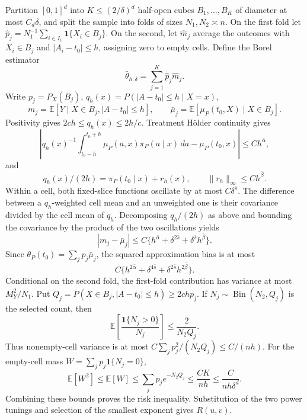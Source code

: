 Partition \([0,1]^d\) into \(K\le(2/\delta)^d\) half-open cubes \(B_1,\ldots,B_K\) of diameter at most \(C_d\delta\), and split the sample into folds of sizes \(N_1,N_2\asymp n\). On the first fold let \(\widehat p_j=N_1^{-1}\sum_{i\in I_1}\mathbf1\{X_i\in B_j\}\). On the second, let \(\widehat m_j\) average the outcomes with \(X_i\in B_j\) and \(\lvert A_i-t_0\rvert\le h\), assigning zero to empty cells. Define the Borel estimator
\[
\widehat\theta_{h,\delta}=\sum_{j=1}^K\widehat p_j\widehat m_j.
\]
Write \(p_j=P_X(B_j)\), \(q_h(x)=P(\lvert A-t_0\rvert\le h\mid X=x)\),
\[
m_j=\mathbb E[Y\mid X\in B_j,\lvert A-t_0\rvert\le h],
\qquad
\bar\mu_j=\mathbb E[\mu_P(t_0,X)\mid X\in B_j].
\]
Positivity gives \(2ch\le q_h(x)\le2h/c\). Treatment Hölder continuity gives
\[
\left|q_h(x)^{-1}\int_{t_0-h}^{t_0+h}
\mu_P(a,x)\pi_P(a\mid x)\,da-\mu_P(t_0,x)\right|
\le Ch^{\bar\alpha},
\]
and
\[
q_h(x)/(2h)=\pi_P(t_0\mid x)+r_h(x),
\qquad \|r_h\|_\infty\le Ch^{\bar\beta}.
\]
Within a cell, both fixed-slice functions oscillate by at most \(C\delta^{\bar s}\). The difference between a \(q_h\)-weighted cell mean and an unweighted one is their covariance divided by the cell mean of \(q_h\). Decomposing \(q_h/(2h)\) as above and bounding the covariance by the product of the two oscillations yields
\[
|m_j-\bar\mu_j|
\le C\{h^{\bar\alpha}+\delta^{2\bar s}+\delta^{\bar s}h^{\bar\beta}\}.
\]
Since \(\theta_P(t_0)=\sum_jp_j\bar\mu_j\), the squared approximation bias is at most
\[
C\{h^{2\bar\alpha}+\delta^{4\bar s}+\delta^{2\bar s}h^{2\bar\beta}\}.
\]
Conditional on the second fold, the first-fold contribution has variance at most \(M_Y^2/N_1\). Put \(Q_j=P(X\in B_j,|A-t_0|\le h)\ge2chp_j\). If \(N_j\sim\operatorname{Bin}(N_2,Q_j)\) is the selected count, then
\[
\mathbb E\!\left[\frac{\mathbf1\{N_j>0\}}{N_j}\right]
\le\frac{2}{N_2Q_j}.
\]
Thus nonempty-cell variance is at most \(C\sum_jp_j^2/(N_2Q_j)\le C/(nh)\). For the empty-cell mass \(W=\sum_jp_j\mathbf1\{N_j=0\}\),
\[
\mathbb E[W^2]\le\mathbb E[W]
\le\sum_jp_je^{-N_2Q_j}
\le\frac{CK}{nh}
\le\frac{C}{nh\delta^d}.
\]
Combining these bounds proves the risk inequality. Substitution of the two power tunings and selection of the smallest exponent gives \(R(u,v)\).